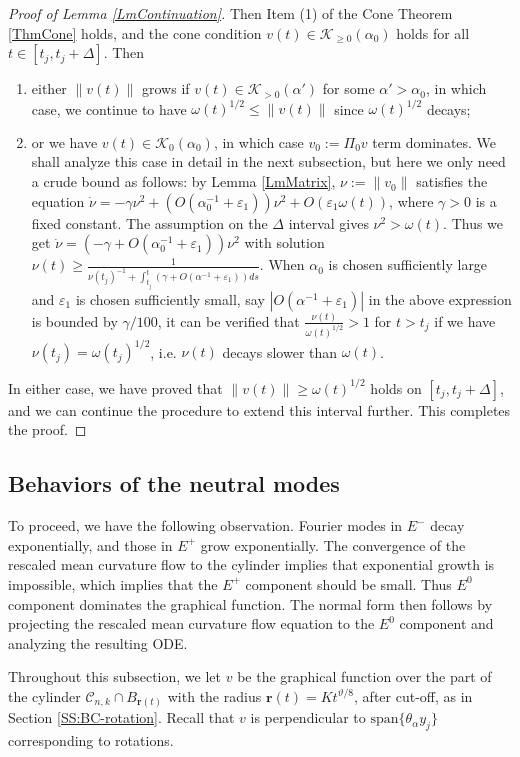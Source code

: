 \documentclass[11pt]{amsart}
\numberwithin{equation}{section}
\numberwithin{equation}{section}
\newcommand{\eps}{\varepsilon}
\newcommand{\br}{\mathbf{r}}
\newcommand{\cK}{\mathcal{K}}
\begin{document}
\begin{proof}[Proof of Lemma \ref{LmContinuation}]
		Then Item (1) of the Cone Theorem \ref{ThmCone} holds, and the cone condition $v(t)\in\cK_{\geq 0}(\alpha_0)$ holds for all $t\in[t_j,t_j+\Delta]$. 
		Then \begin{enumerate}
			\item  either $\|v(t)\|$ grows if $v(t)\in \cK_{>0}(\alpha')$ for some $\alpha'>\alpha_0$, in which case, we continue to have $\omega(t)^{1/2}\leq \|v(t)\|$ since $\omega(t)^{1/2}$ decays; 
			\item or we have $v(t)\in \cK_0(\alpha_0)$, in which case $v_0:=\Pi_0v$ term dominates. We shall analyze this case in detail in the next subsection, but here we only need a crude bound as follows: by Lemma \ref{LmMatrix}, $\nu:=\|v_0\|$ satisfies the equation $\dot\nu=-\gamma\nu^2+(O(\alpha_0^{-1}+\eps_1))\nu^2+O(\eps_1 \omega(t))$, where $\gamma>0$ is a fixed constant. The assumption on the $\Delta$ interval gives $\nu^2>\omega(t)$. Thus we get $\dot\nu=(-\gamma+O(\alpha_0^{-1}+\eps_1))\nu^2$ with solution $\nu(t)\geq \frac{1}{\nu(t_j)^{-1}+\int_{t_j}^t(\gamma+O(\alpha^{-1}+\eps_1))ds}$. When $\alpha_0$ is chosen sufficiently large and $\eps_1$ is chosen sufficiently small, say $|O(\alpha^{-1}+\eps_1)|$ in the above expression is bounded by $\gamma/100$, it can be verified that $\frac{\nu(t)}{\omega(t)^{1/2}}>1$ for $t>t_j$ if we have $\nu(t_j)=\omega(t_j)^{1/2}$, i.e. $\nu(t)$ decays slower than $\omega(t)$. 
		\end{enumerate}
		In either case, we have proved that $\|v(t)\|\geq \omega(t)^{1/2}$ holds on $[t_j,t_j+\Delta]$, and we can continue the procedure to extend this interval further. This completes the proof. 
	\end{proof}
	
	
	
	\subsection{Behaviors of the neutral modes}
	To proceed, we have the following observation. Fourier modes in $E^-$ decay exponentially, and those in $E^+$ grow exponentially. The convergence of the rescaled mean curvature flow to the cylinder implies that exponential growth is impossible, which implies that the $E^+$ component should be small. Thus $E^0$ component dominates the graphical function. The normal form then follows by projecting the rescaled mean curvature flow equation to the $E^0$ component and analyzing the resulting ODE. 
	
	
	
	Throughout this subsection, we let $v$ be the graphical function over the part of the cylinder $\mathcal C_{n,k}\cap B_{\br(t)}$ with the radius $\br(t)=Kt^{\vartheta/8}$, after cut-off, as in Section \ref{SS:BC-rotation}. Recall that $v$ is perpendicular to $\text{span}\{\theta_\alpha y_j\}$ corresponding to rotations. 
	
\end{document}
